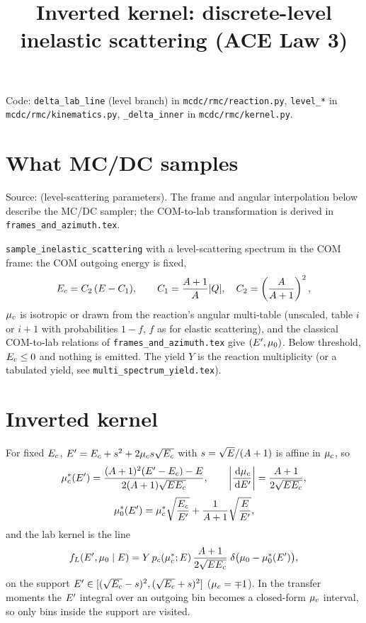 \documentclass[11pt]{article}
\title{Inverted kernel: discrete-level inelastic scattering (ACE Law 3)}
\date{}
\begin{document}
\maketitle

\noindent Code: \texttt{delta\_lab\_line} (level branch) in
\texttt{mcdc/rmc/reaction.py}, \texttt{level\_*} in \texttt{mcdc/rmc/kinematics.py},
\texttt{\_delta\_inner} in \texttt{mcdc/rmc/kernel.py}.

\section{What MC/DC samples}

\noindent Source:  (level-scattering parameters).
The frame and angular interpolation below describe the MC/DC sampler; the
COM-to-lab transformation is derived in \texttt{frames\_and\_azimuth.tex}.

\texttt{sample\_inelastic\_scattering} with a level-scattering spectrum in the COM
frame: the COM outgoing energy is fixed,
\begin{equation}
  E_{c} = C_2\,(E - C_1),\qquad C_1 = \frac{A+1}{A}|Q|,\quad C_2 = \left(\frac{A}{A+1}\right)^2 ,
\end{equation}
$\mu_{c}$ is isotropic or drawn from the reaction's angular multi-table (unscaled,
table $i$ or $i+1$ with probabilities $1-f$, $f$ as for elastic scattering), and the
classical COM-to-lab relations of \texttt{frames\_and\_azimuth.tex} give
$(E', \mu_0)$. Below threshold, $E_{c} \le 0$ and nothing is emitted. The yield $Y$
is the reaction multiplicity (or a tabulated yield, see
\texttt{multi\_spectrum\_yield.tex}).

\section{Inverted kernel}

For fixed $E_{c}$, $E' = E_{c} + s^2 + 2\mu_{c} s\sqrt{E_{c}}$ with $s = \sqrt{E}/(A+1)$
is affine in $\mu_{c}$, so
\begin{equation}
  \mu_{c}^*(E') = \frac{(A+1)^2(E' - E_{c}) - E}{2(A+1)\sqrt{EE_{c}}},\qquad
  \left|\frac{\,\mathrm{d}\mu_{c}}{\,\mathrm{d}E'}\right| = \frac{A+1}{2\sqrt{EE_{c}}},
\end{equation}
\begin{equation}
  \mu_0^*(E') = \mu_{c}^*\sqrt{\frac{E_{c}}{E'}} + \frac{1}{A+1}\sqrt{\frac{E}{E'}},
\end{equation}
and the lab kernel is the line
\begin{equation}
  f_L(E', \mu_0 \mid E) = Y\,p_c(\mu_{c}^*; E)\,\frac{A+1}{2\sqrt{EE_{c}}}\;
  \delta\big(\mu_0 - \mu_0^*(E')\big),
\end{equation}
on the support $E' \in [(\sqrt{E_{c}} - s)^2, (\sqrt{E_{c}} + s)^2]$ ($\mu_{c} = \mp1$).
In the transfer moments the $E'$ integral over an outgoing bin becomes a closed-form
$\mu_{c}$ interval, so only bins inside the support are visited.
\end{document}
